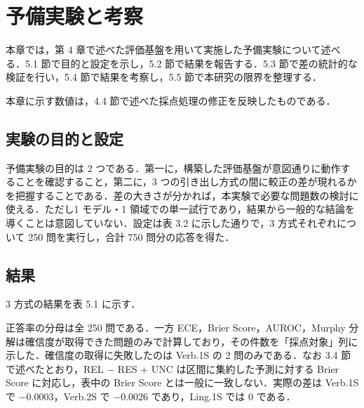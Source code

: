 \chapter{予備実験と考察}

本章では，第 4 章で述べた評価基盤を用いて実施した予備実験について述べる．5.1 節で目的と設定を示し，5.2 節で結果を報告する．5.3 節で差の統計的な検証を行い，5.4 節で結果を考察し，5.5 節で本研究の限界を整理する．

本章に示す数値は，4.4 節で述べた採点処理の修正を反映したものである．

\section{実験の目的と設定}

予備実験の目的は 2 つである．第一に，構築した評価基盤が意図通りに動作することを確認すること，第二に，3 つの引き出し方式の間に較正の差が現れるかを把握することである．差の大きさが分かれば，本実験で必要な問題数の検討に使える．ただし1 モデル・1 領域での単一試行であり，結果から一般的な結論を導くことは意図していない．設定は表 3.2 に示した通りで，3 方式それぞれについて 250 問を実行し，合計 750 問分の応答を得た．

\section{結果}

3 方式の結果を表 5.1 に示す．

\begin{table}[htbp]
\centering
\small
\caption{3 方式の比較（日本語版 MGSM，250 問）}
\label{tab:5.1}
\end{table}

正答率の分母は全 250 問である．一方 ECE，Brier Score，AUROC，Murphy 分解は確信度が取得できた問題のみで計算しており，その件数を「採点対象」列に示した．確信度の取得に失敗したのは Verb.1S の 2 問のみである．なお 3.4 節で述べたとおり，REL − RES + UNC は区間に集約した予測に対する Brier Score に対応し，表中の Brier Score とは一般に一致しない．実際の差は Verb.1S で −0.0003，Verb.2S で −0.0026 であり，Ling.1S では 0 である．

